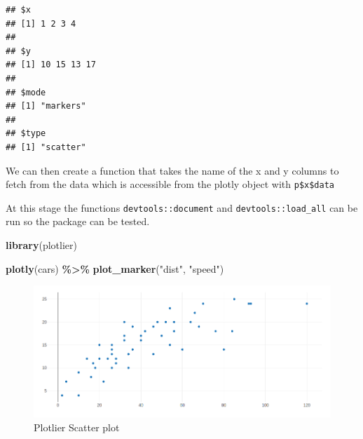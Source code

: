 \documentclass[
]{krantz}
\makeatletter
\newenvironment{Shaded}{\begin{snugshade}}{\end{snugshade}}
\newcommand{\CommentTok}[1]{\textcolor[rgb]{0.37,0.37,0.37}{\textit{#1}}}
\newcommand{\ControlFlowTok}[1]{\textcolor[rgb]{0.27,0.27,0.27}{\textbf{#1}}}
\newcommand{\DataTypeTok}[1]{\textcolor[rgb]{0.27,0.27,0.27}{#1}}
\newcommand{\KeywordTok}[1]{\textcolor[rgb]{0.27,0.27,0.27}{\textbf{#1}}}
\newcommand{\NormalTok}[1]{#1}
\newcommand{\OperatorTok}[1]{\textcolor[rgb]{0.43,0.43,0.43}{\textbf{#1}}}
\newcommand{\StringTok}[1]{\textcolor[rgb]{0.5,0.5,0.5}{#1}}
\newenvironment{kframe}{%
\medskip{}
\setlength{\fboxsep}{.8em}
 \def\at@end@of@kframe{}%
 \ifinner\ifhmode%
  \def\at@end@of@kframe{\end{minipage}}%
  \begin{minipage}{\columnwidth}%
 \fi\fi%
 \def\FrameCommand##1{\hskip\@totalleftmargin \hskip-\fboxsep
 \colorbox{shadecolor}{##1}\hskip-\fboxsep
     \hskip-\linewidth \hskip-\@totalleftmargin \hskip\columnwidth}%
 \MakeFramed {\advance\hsize-\width
   \@totalleftmargin\z@ \linewidth\hsize
   \@setminipage}}%
 {\par\unskip\endMakeFramed%
 \at@end@of@kframe}
\renewenvironment{Shaded}{\begin{kframe}}{\end{kframe}}
\makeatother
\begin{document}
\begin{verbatim}
## $x
## [1] 1 2 3 4
## 
## $y
## [1] 10 15 13 17
## 
## $mode
## [1] "markers"
## 
## $type
## [1] "scatter"
\end{verbatim}

We can then create a function that takes the name of the x and y columns to fetch from the data which is accessible from the plotly object with \texttt{p\$x\$data}

\begin{Shaded}
\end{Shaded}

At this stage the functions \texttt{devtools::document} and \texttt{devtools::load\_all} can be run so the package can be tested.

\begin{Shaded}
\begin{Highlighting}[]
\KeywordTok{library}\NormalTok{(plotlier)}

\KeywordTok{plotly}\NormalTok{(cars) }\OperatorTok{\%\textgreater{}\%}\StringTok{ }
\StringTok{  }\KeywordTok{plot\_marker}\NormalTok{(}\StringTok{"dist"}\NormalTok{, }\StringTok{"speed"}\NormalTok{)}
\end{Highlighting}
\end{Shaded}

\begin{figure}
\centering
\includegraphics{images/plotlier-scatter.png}
\caption{Plotlier Scatter plot}
\end{figure}
\end{document}

